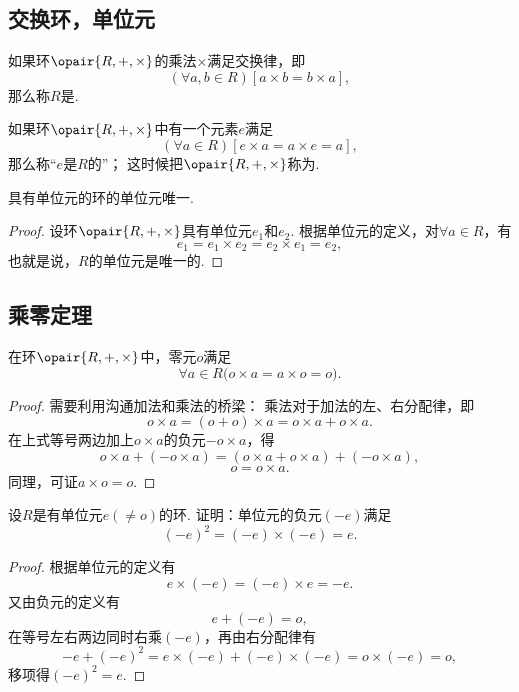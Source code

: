 \subsection{交换环，单位元}
\begin{definition}
如果环\(\opair{R,+,\times}\)的乘法\(\times\)满足交换律，即\[
	(\forall a,b \in R)[a \times b = b \times a],
\]
那么称\(R\)是.
\end{definition}

\begin{definition}
如果环\(\opair{R,+,\times}\)中有一个元素\(e\)满足\[
	(\forall a \in R)[e \times a = a \times e = a],
\]
那么称“\(e\)是\(R\)的”；
这时候把\(\opair{R,+,\times}\)称为.
\end{definition}

\begin{property}
具有单位元的环的单位元唯一.
\begin{proof}
设环\(\opair{R,+,\times}\)具有单位元\(e_1\)和\(e_2\).
根据单位元的定义，对\(\forall a \in R\)，有\[
    e_1 = e_1 \times e_2 = e_2 \times e_1 = e_2,
\]
也就是说，\(R\)的单位元是唯一的.
\end{proof}
\end{property}

\subsection{乘零定理}
\begin{theorem}[乘零定理]
在环\(\opair{R,+,\times}\)中，零元\(o\)满足\[
    \forall a \in R \bigl( o \times a = a \times o = o \bigr).
\]
\begin{proof}
需要利用沟通加法和乘法的桥梁：
乘法对于加法的左、右分配律，即\[
    o \times a = (o + o) \times a = o \times a + o \times a.
\]在上式等号两边加上\(o \times a\)的负元\(-o \times a\)，得\[
    o \times a + (- o \times a) = (o \times a + o \times a) + (- o \times a),
\]\[
    o = o \times a.
\]
同理，可证\(a \times o = o\).
\end{proof}
\end{theorem}

\begin{example}
设\(R\)是有单位元\(e(\neq o)\)的环.
证明：单位元的负元\((-e)\)满足\[
    (-e)^2=(-e)\times(-e)=e.
\]
\begin{proof}
根据单位元的定义有\[
    e \times (-e) = (-e) \times e = -e.
\]
又由负元的定义有\[
    e + (-e) = o,
\]
在等号左右两边同时右乘\((-e)\)，再由右分配律有\[
    -e + (-e)^2 = e \times (-e) + (-e) \times (-e) = o \times (-e) = o,
\]
移项得\((-e)^2 = e\).
\end{proof}
\end{example}

